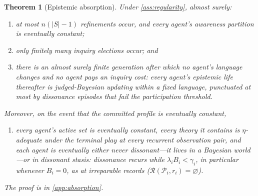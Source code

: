 \documentclass[11pt]{article}
\newtheorem{theorem}[assumption]{Theorem}
\theoremstyle{definition}
\newcommand{\emptysetset}{\varnothing}
\begin{document}
\begin{theorem}[Epistemic absorption]
\label{thm:absorption}
Under \cref{ass:regularity}, almost surely:
\begin{enumerate}[label=(\alph*)]
  \item at most $n(|S|-1)$ refinements occur, and every agent's awareness
  partition is eventually constant;
  \item only finitely many inquiry elections occur; and
  \item there is an almost surely finite generation after which no agent's
  language changes and no agent pays an inquiry cost: every agent's
  epistemic life thereafter is judged-Bayesian updating within a fixed
  language, punctuated at most by dissonance episodes that fail the
  participation threshold.
\end{enumerate}
Moreover, on the event that the committed profile is eventually constant,
\begin{enumerate}[label=(\alph*),start=4]
  \item every agent's active set is eventually constant, every theory it
  contains is $\eta$-adequate under the terminal play at every recurrent
  observation pair, and each agent is eventually either never
  dissonant---it lives in a Bayesian world---or in \emph{dissonant stasis}:
  dissonance recurs while $\lambda_iB_i<\gamma_i$, in particular whenever
  $B_i=0$, as at irreparable records
  ($\mathcal R(\mathcal P_i,r_i)=\emptysetset$).
\end{enumerate}
The proof is in \cref{app:absorption}.
\end{theorem}
\end{document}
